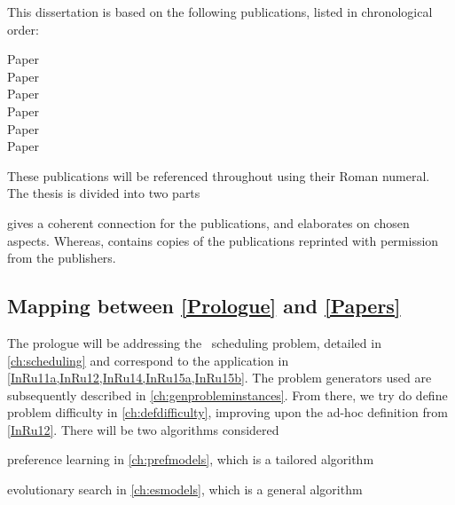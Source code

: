 This dissertation is based on the following publications, listed in 
chronological order:
{\raggedright
\begin{description} 
    \item[Paper ] 
    \item[Paper ] 
    \item[Paper  ] 
    \item[Paper  ] 
    \item[Paper ] 
    \item[Paper ] 
\end{description}}

\noindent These publications will be referenced throughout using their Roman 
numeral. 
The thesis is divided into two parts
\begin{enumerate*}[label={{}}]
    \item \emph{}
    \item \emph{}
\end{enumerate*}
 gives a coherent connection for the publications, and 
elaborates on chosen aspects. Whereas,  contains copies of the 
publications reprinted with permission from the publishers.

\clearpage
\subsection*{Mapping between \cref{Prologue} and \cref{Papers}}
The prologue will be addressing the \jsp\ scheduling problem, detailed in 
\cref{ch:scheduling} and correspond to the application in 
\cref{InRu11a,InRu12,InRu14,InRu15a,InRu15b}. The problem generators 
used are subsequently described in \cref{ch:genprobleminstances}.
From there, we try do define problem difficulty in \cref{ch:defdifficulty}, 
improving upon the ad-hoc definition from \cref{InRu12}. 
There will be two algorithms considered
\begin{enumerate*}
    \item preference learning in \cref{ch:prefmodels}, which is a tailored 
    algorithm
    \item evolutionary search in \cref{ch:esmodels}, which is a general 
    algorithm
\end{enumerate*}

